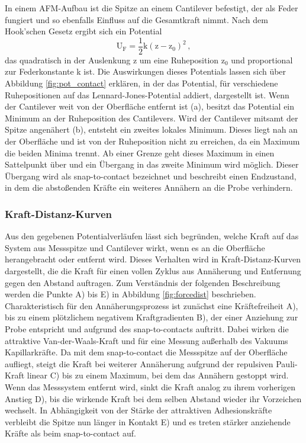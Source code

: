           \FloatBarrier      
          In einem AFM-Aufbau ist die Spitze an einem Cantilever befestigt, der als Feder fungiert und so ebenfalls Einfluss auf die Gesamtkraft nimmt. Nach dem Hook'schen Gesetz ergibt sich ein Potential 
          \begin{equation*}
            \text{U}_{\text{F}} = \frac{1}{2} \text{k} \left(\text{z} - \text{z}_0\right)^2 \, ,
          \end{equation*}
          das quadratisch in der Auslenkung z um eine Ruheposition z$_0$ und proportional zur Federkonstante k ist. 
          Die Auswirkungen dieses Potentials lassen sich über Abbildung \ref{fig:pot_contact} erklären, in der 
          das Potential, für verschiedene Ruhepositionen auf das Lennard-Jones-Potential addiert, dargestellt ist. Wenn der Cantilever weit von der Oberfläche entfernt ist (a), besitzt das Potential ein 
          Minimum an der Ruheposition des Cantilevers. Wird der Cantilever mitsamt der Spitze angenähert (b), entsteht ein zweites lokales Minimum. Dieses liegt nah an der Oberfläche und ist von der Ruheposition
          nicht zu erreichen, da ein Maximum die beiden Minima trennt. Ab einer Grenze geht dieses Maximum in einen Sattelpunkt über und ein Übergang in das zweite Minimum wird möglich. Dieser Übergang wird als
          snap-to-contact bezeichnet und beschreibt einen Endzustand, in dem die abstoßenden Kräfte ein weiteres Annähern an die Probe verhindern. 




        \newpage
        \subsubsection{Kraft-Distanz-Kurven}
        \label{sec:KraftAbstand}

          Aus den gegebenen Potentialverläufen lässt sich begründen, welche Kraft auf das System aus Messspitze und Cantilever wirkt, wenn es an die Oberfläche herangebracht oder entfernt wird. Dieses Verhalten
          wird in Kraft-Distanz-Kurven dargestellt, die die Kraft für einen vollen Zyklus aus Annäherung und Entfernung gegen den Abstand auftragen. Zum Verständnis der folgenden Beschreibung werden die Punkte A) bis E) in Abbildung \ref{fig:forcedist} beschrieben. Charakteristisch für den Annäherungsprozess ist zunächst
          eine Kräftefreiheit A), bis zu einem plötzlichem negativem Kraftgradienten B), der einer Anziehung zur Probe entspricht und aufgrund des snap-to-contacts auftritt. Dabei wirken die attraktive Van-der-Waals-Kraft und für eine Messung außerhalb des Vakuums Kapillarkräfte. Da mit dem snap-to-contact die Messspitze auf 
          der Oberfläche aufliegt, steigt die Kraft bei weiterer Annäherung aufgrund der repulsiven Pauli-Kraft linear C) bis zu einem Maximum, bei dem das Annähern gestoppt wird. Wenn das Messsystem entfernt wird, sinkt die Kraft analog zu ihrem 
          vorherigen Anstieg D), bis die wirkende Kraft bei dem selben Abstand wieder ihr Vorzeichen wechselt. In Abhängigkeit von der Stärke der attraktiven Adhesionskräfte verbleibt die Spitze nun länger in Kontakt E) und es treten stärker anziehende Kräfte als beim snap-to-contact auf. 
          
